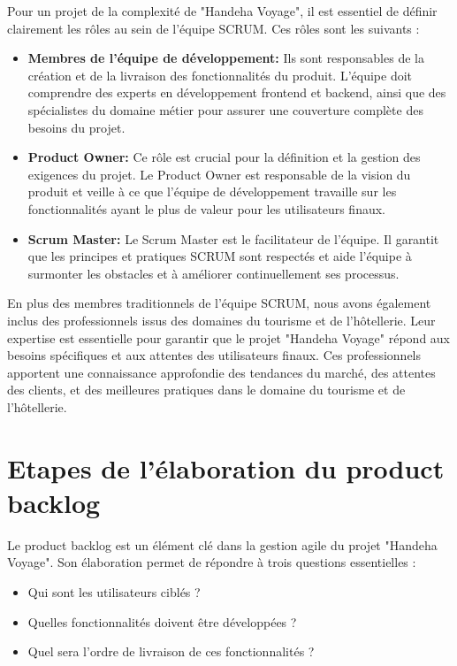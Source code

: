 \documentclass[12pt]{report}
\begin{document}
				Pour un projet de la complexité de "Handeha Voyage", il est essentiel de définir clairement les rôles au sein de l'équipe SCRUM. Ces rôles sont les suivants :

				\begin{itemize}
					\item \textbf{Membres de l'équipe de développement:} Ils sont responsables de la création et de la livraison des fonctionnalités du produit. L'équipe doit comprendre des experts en développement frontend et backend, ainsi que des spécialistes du domaine métier pour assurer une couverture complète des besoins du projet.
					\item \textbf{Product Owner:} Ce rôle est crucial pour la définition et la gestion des exigences du projet. Le Product Owner est responsable de la vision du produit et veille à ce que l'équipe de développement travaille sur les fonctionnalités ayant le plus de valeur pour les utilisateurs finaux.
					\item \textbf{Scrum Master:} Le Scrum Master est le facilitateur de l'équipe. Il garantit que les principes et pratiques SCRUM sont respectés et aide l'équipe à surmonter les obstacles et à améliorer continuellement ses processus.
				\end{itemize}
				
				En plus des membres traditionnels de l'équipe SCRUM, nous avons également inclus des professionnels issus des domaines du tourisme et de l'hôtellerie. Leur expertise est essentielle pour garantir que le projet "Handeha Voyage" répond aux besoins spécifiques et aux attentes des utilisateurs finaux. Ces professionnels apportent une connaissance approfondie des tendances du marché, des attentes des clients, et des meilleures pratiques dans le domaine du tourisme et de l'hôtellerie.

				\section{Etapes de l’élaboration du product backlog}

				\hspace{15pt} Le product backlog est un élément clé dans la gestion agile du projet "Handeha Voyage". Son élaboration permet de répondre à trois questions essentielles :

				\begin{itemize}
					\item Qui sont les utilisateurs ciblés ?
					\item Quelles fonctionnalités doivent être développées ?
					\item Quel sera l'ordre de livraison de ces fonctionnalités ?
				\end{itemize}
\end{document}
